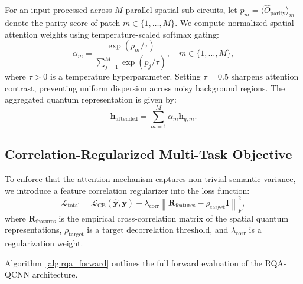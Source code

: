 \documentclass[10pt,twocolumn,twoside,a4paper]{article}
\begin{document}
For an input processed across $M$ parallel spatial sub-circuits, let $p_m = \langle \hat{O}_{\text{parity}} \rangle_m$ denote the parity score of patch $m \in \{1, \dots, M\}$. We compute normalized spatial attention weights using temperature-scaled softmax gating:
\begin{equation}
    \alpha_m = \frac{\exp\left( p_m / \tau \right)}{\sum_{j=1}^M \exp\left( p_j / \tau \right)}, \quad m \in \{1, \dots, M\},
    \label{eq:softmax_gating}
\end{equation}
where $\tau > 0$ is a temperature hyperparameter. Setting $\tau = 0.5$ sharpens attention contrast, preventing uniform dispersion across noisy background regions. The aggregated quantum representation is given by:
\begin{equation}
    \mathbf{h}_{\text{attended}} = \sum_{m=1}^M \alpha_m \mathbf{h}_{q, m}.
\end{equation}

\subsection{Correlation-Regularized Multi-Task Objective}
To enforce that the attention mechanism captures non-trivial semantic variance, we introduce a feature correlation regularizer into the loss function:
\begin{equation}
    \mathcal{L}_{\text{total}} = \mathcal{L}_{\text{CE}}(\hat{\mathbf{y}}, \mathbf{y}) + \lambda_{\text{corr}} \left\| \mathbf{R}_{\text{features}} - \rho_{\text{target}} \mathbf{I} \right\|_F^2,
    \label{eq:loss_rqa}
\end{equation}
where $\mathbf{R}_{\text{features}}$ is the empirical cross-correlation matrix of the spatial quantum representations, $\rho_{\text{target}}$ is a target decorrelation threshold, and $\lambda_{\text{corr}}$ is a regularization weight. 

Algorithm~\ref{alg:rqa_forward} outlines the full forward evaluation of the RQA-QCNN architecture.
\end{document}
